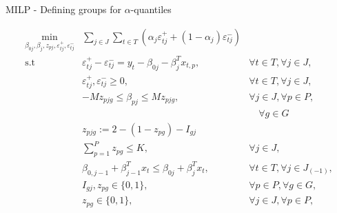 \begin{frame}{MILP - Defining groups for \(\alpha\)-quantiles}

\[
\begin{array}{lll}
 \underset{\beta_{0j},\beta_j,z_{p j}, \varepsilon_{t j}^{+},\varepsilon_{t j}^{-}}{\text{min}} & \sum_{j \in J} \sum_{t\in T}\left(\alpha_j\varepsilon_{t j}^{+}+(1-\alpha_j)\varepsilon_{t j}^{-}\right)  & \\
\mbox{s.t } & \varepsilon_{t j}^{+}-\varepsilon_{t j}^{-}=y_{t}-\beta_{0 j}-\beta_{j}^T x_{t,p},& \forall t \in T ,\forall j \in J, \\
& \varepsilon_{t j}^{+},\varepsilon_{t j}^{-}\geq0,&\forall t \in T ,\forall j \in 
J, \\
& - M z_{p j g} \leq \beta_{p j} \leq M z_{p j g},& \forall j \in J, \forall p\in P,  \\
& & \quad \forall g \in G \\
&z_{p j g} := 2 - ( 1-z_{pg}) - I_{gj}& \\
& \sum_{p=1}^P z_{p g} \leq K, &  \forall j \in J, \\
& \beta_{0,j-1} + \beta_{j-1}^T x_{t} \leq \beta_{0j} + \beta_{j}^T x_{t}, & \forall t \in T, \forall j \in J_{(-1)},\\
& I_{gj}, z_{pg} \in \{0,1\},& \forall p \in P,\forall g \in G, \\
& z_{p g} \in \{0,1\},& \forall j \in J, \forall p\in P,\\
\end{array}
\]

\end{frame}

